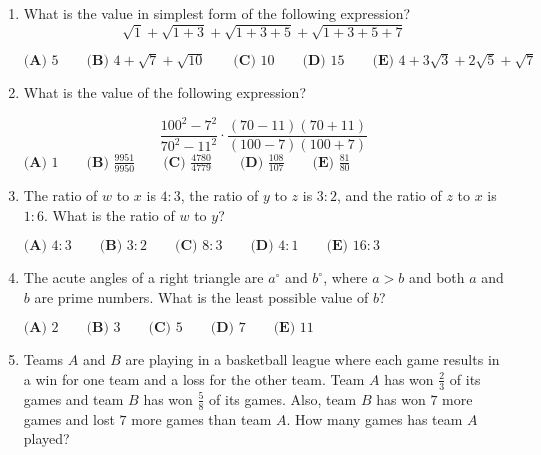 \documentclass{article}
\begin{document}
\begin{enumerate}[label=\arabic*., itemsep=0.5em]\item What is the value in simplest form of the following expression?
\begin{equation*}
\sqrt{1} + \sqrt{1+3} + \sqrt{1+3+5} + \sqrt{1+3+5+7}
\end{equation*}


\(\textbf{(A) }5 \qquad \textbf{(B) }4 + \sqrt{7} + \sqrt{10} \qquad \textbf{(C) } 10 \qquad \textbf{(D) } 15 \qquad \textbf{(E) } 4 + 3\sqrt{3} + 2\sqrt{5} + \sqrt{7}\)\par \vspace{0.5em}\item What is the value of the following expression?

\begin{equation*}
\frac{100^2-7^2}{70^2-11^2} \cdot \frac{(70-11)(70+11)}{(100-7)(100+7)}
\end{equation*}
\(\textbf{(A) } 1 \qquad \textbf{(B) } \frac{9951}{9950} \qquad \textbf{(C) } \frac{4780}{4779} \qquad \textbf{(D) } \frac{108}{107} \qquad \textbf{(E) } \frac{81}{80} \)\par \vspace{0.5em}\item The ratio of \(w\) to \(x\) is \(4 : 3\), the ratio of \(y\) to \(z\) is \(3 : 2\), and the ratio of \(z\) to \(x\) is \(1 : 6\). What is the ratio of \(w\) to \(y\)?

\(\textbf{(A) }4:3 \qquad \textbf{(B) }3:2 \qquad \textbf{(C) } 8:3 \qquad \textbf{(D) } 4:1 \qquad \textbf{(E) } 16:3 \)\par \vspace{0.5em}\item The acute angles of a right triangle are \(a^{\circ}\) and \(b^{\circ}\), where \(a>b\) and both \(a\) and \(b\) are prime numbers. What is the least possible value of \(b\)?

\(\textbf{(A) }2\qquad\textbf{(B) }3\qquad\textbf{(C) }5\qquad\textbf{(D) }7\qquad\textbf{(E) }11\)\par \vspace{0.5em}\item Teams \(A\) and \(B\) are playing in a basketball league where each game results in a win for one team and a loss for the other team. Team \(A\) has won \(\tfrac{2}{3}\) of its games and team \(B\) has won \(\tfrac{5}{8}\) of its games. Also, team \(B\) has won \(7\) more games and lost \(7\) more games than team \(A.\) How many games has team \(A\) played?


\end{enumerate}
\end{document}
